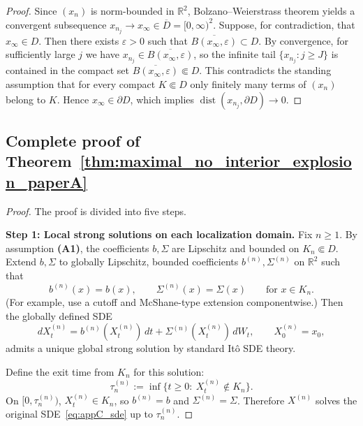 \documentclass[pdflatex,sn-mathphys-ay]{sn-jnl}
\theoremstyle{thmstyleone}
\theoremstyle{definition}
\theoremstyle{remark}
\begin{document}
\begin{appendices}
\begin{proof}
Since \((x_n)\) is norm-bounded in \(\mathbb R^2\), Bolzano--Weierstrass theorem yields a convergent subsequence \(x_{n_j}\to x_\infty\in\overline D=[0,\infty)^2\). 
Suppose, for contradiction, that $x_{\infty}\in D$. Then there exists $\varepsilon>0$ such that 
\(\overline{B(x_\infty,\varepsilon)}\subset D\). 
By convergence, for sufficiently large $j$ we have \(x_{n_j}\in \overline{B(x_\infty,\varepsilon)}\), so the infinite tail $\{x_{n_j}:j\ge J\}$ is contained in the compact set \(\overline{B(x_\infty,\varepsilon)}\Subset D\). 
This contradicts the standing assumption that for every compact \(K\Subset D\) only finitely many terms of $(x_n)$ belong to $K$. Hence \(x_\infty\in\partial D\), which implies \(\operatorname{dist}(x_{n_j},\partial D)\to 0\).
\end{proof}

\subsection{Complete proof of Theorem~\ref{thm:maximal_no_interior_explosion_paperA}}
\label{appC:proof_theorem_maximal}

\begin{proof}
The proof is divided into five steps.

\medskip
\noindent\textbf{Step 1: Local strong solutions on each localization domain.}
Fix \(n\ge1\). By assumption \textbf{(A1)}, the coefficients \(b,\Sigma\) are Lipschitz and bounded on \(K_n\Subset D\). Extend \(b,\Sigma\) to globally Lipschitz, bounded coefficients \(b^{(n)},\Sigma^{(n)}\) on \(\mathbb R^2\) such that
\[
b^{(n)}(x)=b(x),\qquad \Sigma^{(n)}(x)=\Sigma(x)\qquad \text{for }x\in K_n.
\]
(For example, use a cutoff and McShane-type extension componentwise.)
Then the globally defined SDE
\begin{equation}
\label{eq:appC_sde_extended}
dX_t^{(n)}=b^{(n)}(X_t^{(n)})\,dt+\Sigma^{(n)}(X_t^{(n)})\,dW_t,\qquad X_0^{(n)}=x_0,
\end{equation}
admits a unique global strong solution by standard It\^o SDE theory.

Define the exit time from \(K_n\) for this solution:
\[
\tau_n^{(n)}:=\inf\{t\ge0:\ X_t^{(n)}\notin K_n\}.
\]
On \([0,\tau_n^{(n)})\), \(X_t^{(n)}\in K_n\), so \(b^{(n)}=b\) and \(\Sigma^{(n)}=\Sigma\). Therefore \(X^{(n)}\) solves the original SDE~\eqref{eq:appC_sde} up to \(\tau_n^{(n)}\).


\end{proof}
\end{appendices}
\end{document}
